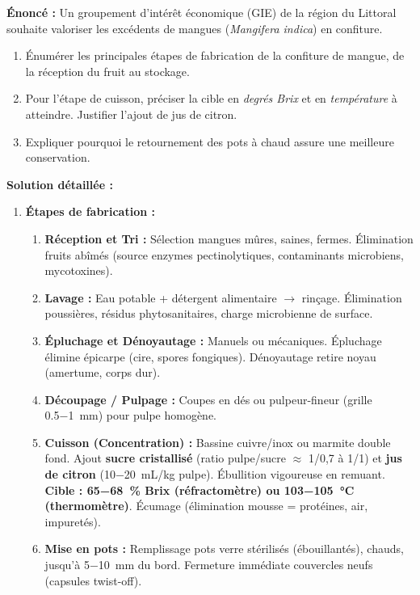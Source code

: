 \documentclass[11pt]{article}
\begin{document}
\begin{exoresolu}
    \textbf{Énoncé :} Un groupement d'intérêt économique (GIE) de la région du Littoral souhaite valoriser les excédents de mangues (\emph{Mangifera indica}) en confiture. 
    \begin{enumerate}
        \item Énumérer les principales étapes de fabrication de la confiture de mangue, de la réception du fruit au stockage.
        \item Pour l'étape de cuisson, préciser la cible en \emph{degrés Brix} et en \emph{température} à atteindre. Justifier l'ajout de jus de citron.
        \item Expliquer pourquoi le retournement des pots à chaud assure une meilleure conservation.
    \end{enumerate}
    \tcblower
    \textbf{Solution détaillée :}
    \begin{enumerate}
        \item \textbf{Étapes de fabrication :}
            \begin{enumerate}
                \item \textbf{Réception et Tri :} Sélection mangues mûres, saines, fermes. Élimination fruits abîmés (source enzymes pectinolytiques, contaminants microbiens, mycotoxines).
                \item \textbf{Lavage :} Eau potable + détergent alimentaire $\rightarrow$ rinçage. Élimination poussières, résidus phytosanitaires, charge microbienne de surface.
                \item \textbf{Épluchage et Dénoyautage :} Manuels ou mécaniques. Épluchage élimine épicarpe (cire, spores fongiques). Dénoyautage retire noyau (amertume, corps dur).
                \item \textbf{Découpage / Pulpage :} Coupes en dés ou pulpeur-fineur (grille \SI{0,5-1}{mm}) pour pulpe homogène.
                \item \textbf{Cuisson (Concentration) :} Bassine cuivre/inox ou marmite double fond. Ajout \textbf{sucre cristallisé} (ratio pulpe/sucre $\approx$ 1/0,7 à 1/1) et \textbf{jus de citron} (\SI{10-20}{mL/kg} pulpe). Ébullition vigoureuse en remuant. \textbf{Cible : \SI{65-68}{\%} Brix (réfractomètre) ou \SI{103-105}{\celsius} (thermomètre)}. Écumage (élimination mousse = protéines, air, impuretés).
                \item \textbf{Mise en pots :} Remplissage pots verre stérilisés (ébouillantés), chauds, jusqu'à \SI{5-10}{mm} du bord. Fermeture immédiate couvercles neufs (capsules twist-off).

\end{enumerate}
\end{enumerate}
\end{exoresolu}
\end{document}
